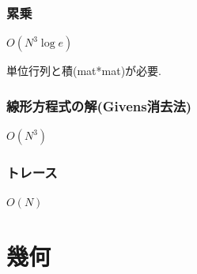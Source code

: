 \documentclass[9pt,twocolumn,a4paper,landscape]{extarticle}
\begin{document}
\subsubsection{累乗}
$O(N^3 \log e)$\par
単位行列と積(mat*mat)が必要.\par


\subsubsection{線形方程式の解(Givens消去法)}
$O(N^3)$


\subsubsection{トレース}
$O(N)$


\section{幾何}

\end{document}
